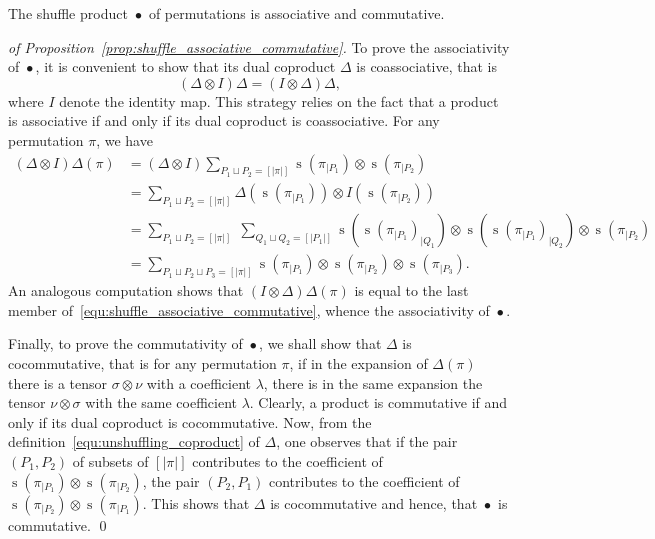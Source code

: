 \documentclass[a4paper]{llncs}
\DeclareMathOperator{\STD}{\mathrm{s}}
\DeclareMathOperator{\SHUFFLE}{\bullet}
\begin{document}
\begin{proposition} \label{prop:shuffle_associative_commutative}
    The shuffle product $\SHUFFLE$ of permutations is associative and
    commutative.
\end{proposition}
\begin{proof}[of Proposition~\ref{prop:shuffle_associative_commutative}]
    To prove the associativity of $\SHUFFLE$, it is convenient to show
    that its dual coproduct $\Delta$ is coassociative, that is
    \begin{equation}
        (\Delta \otimes I) \Delta = (I \otimes \Delta) \Delta,
    \end{equation}
    where $I$ denote the identity map. This strategy relies on the fact
    that a product is associative if and only if its dual coproduct is
    coassociative. For any permutation $\pi$, we have
    \begin{equation} \begin{split}
    \label{equ:shuffle_associative_commutative}
        (\Delta \otimes I) \Delta(\pi) & =
        (\Delta \otimes I)
        \sum_{P_1 \sqcup P_2 = [|\pi|]}
        \STD\left(\pi_{|P_1}\right) \otimes \STD\left(\pi_{|P_2}\right) \\
        & =
        \sum_{P_1 \sqcup P_2 = [|\pi|]}
        \Delta\left(\STD\left(\pi_{|P_1}\right)\right)
        \otimes I\left(\STD\left(\pi_{|P_2}\right)\right) \\
        & =
        \sum_{P_1 \sqcup P_2 = [|\pi|]} \;
        \sum_{Q_1 \sqcup Q_2 = [|P_1|]}
        \STD\left(\STD\left(\pi_{|P_1}\right)_{|Q_1}\right)
        \otimes
        \STD\left(\STD\left(\pi_{|P_1}\right)_{|Q_2}\right)
        \otimes \STD\left(\pi_{|P_2}\right) \\
        & =
        \sum_{P_1 \sqcup P_2 \sqcup P_3 = [|\pi|]}
        \STD\left(\pi_{|P_1}\right) \otimes
        \STD\left(\pi_{|P_2}\right) \otimes
        \STD\left(\pi_{|P_3}\right).
    \end{split} \end{equation}
    An analogous computation shows that $(I \otimes \Delta) \Delta(\pi)$
    is equal to the last member
    of~\eqref{equ:shuffle_associative_commutative}, whence the
    associativity of $\SHUFFLE$.
    \smallskip

    Finally, to prove the commutativity of $\SHUFFLE$, we shall show
    that $\Delta$ is cocommutative, that is for any permutation $\pi$,
    if in the expansion of $\Delta(\pi)$ there is a tensor
    $\sigma \otimes \nu$ with a coefficient $\lambda$, there is in the
    same expansion the tensor $\nu \otimes \sigma$ with the same
    coefficient $\lambda$. Clearly, a product is commutative if and only
    if its dual coproduct is cocommutative. Now, from the
    definition~\eqref{equ:unshuffling_coproduct} of $\Delta$, one
    observes that if the pair $(P_1, P_2)$ of subsets of $[|\pi|]$
    contributes to the coefficient of
    $\STD\left(\pi_{|P_1}\right) \otimes \STD\left(\pi_{|P_2}\right)$,
    the pair $(P_2, P_1)$ contributes to the coefficient of
    $\STD\left(\pi_{|P_2}\right) \otimes \STD\left(\pi_{|P_1}\right)$.
    This shows that $\Delta$ is cocommutative and hence, that $\SHUFFLE$
    is commutative.
    \qed
\end{proof}
\medskip
\end{document}
